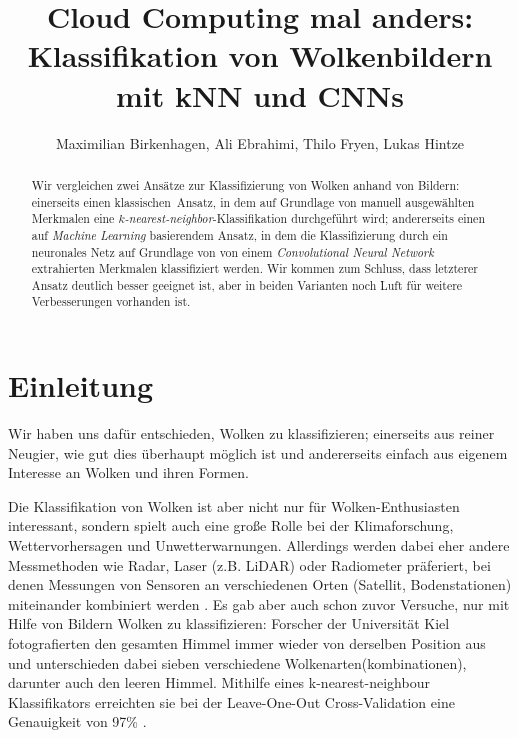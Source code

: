 \documentclass[a4,german]{article}
\begin{document}
\title{Cloud Computing mal anders: Klassifikation von Wolkenbildern mit kNN und CNNs}
\author{Maximilian Birkenhagen, Ali Ebrahimi, Thilo Fryen, Lukas Hintze}
\maketitle

\begin{abstract}
    Wir vergleichen zwei Ansätze zur Klassifizierung von Wolken anhand von Bildern:
        einerseits einen \glqq klassischen\grqq\ Ansatz, in dem auf Grundlage von manuell ausgewählten Merkmalen eine \emph{$k$-nearest-neighbor}-Klassifika\-tion durchgeführt wird;
        andererseits einen auf \emph{Machine Learning} basierendem Ansatz, in dem die Klassifizierung durch ein neuronales Netz auf Grundlage von von einem \emph{Convolutional Neural Network} extrahierten Merkmalen klassifiziert werden.
    Wir kommen zum Schluss, dass letzterer Ansatz deutlich besser geeignet ist, aber in beiden Varianten noch Luft für weitere Verbesserungen vorhanden ist.
\end{abstract}

\section{Einleitung}

Wir haben uns dafür entschieden, Wolken zu klassifizieren; einerseits aus reiner Neugier, wie gut dies überhaupt möglich ist und andererseits einfach aus eigenem Interesse an Wolken und ihren Formen.

Die Klassifikation von Wolken ist aber nicht nur für Wolken-Enthusiasten interessant, sondern spielt auch eine große Rolle bei der Klimaforschung, Wettervorhersagen und Unwetterwarnungen.
Allerdings werden dabei eher andere Messmethoden wie Radar, Laser (z.B. LiDAR) oder Radiometer präferiert, bei denen Messungen von Sensoren an verschiedenen Orten (Satellit, Bodenstationen) miteinander kombiniert werden \cite{wang}.
Es gab aber auch schon zuvor Versuche, nur mit Hilfe von Bildern Wolken zu klassifizieren:
Forscher der Universität Kiel fotografierten den gesamten Himmel immer wieder von derselben Position aus und unterschieden dabei sieben verschiedene Wolkenarten(kombinationen), darunter auch den \glqq leeren Himmel\grqq.
Mithilfe eines k-nearest-neighbour Klassifikators erreichten sie bei der Leave-One-Out Cross-Validation eine Genauigkeit von 97\% \cite{heinle}.
\end{document}
